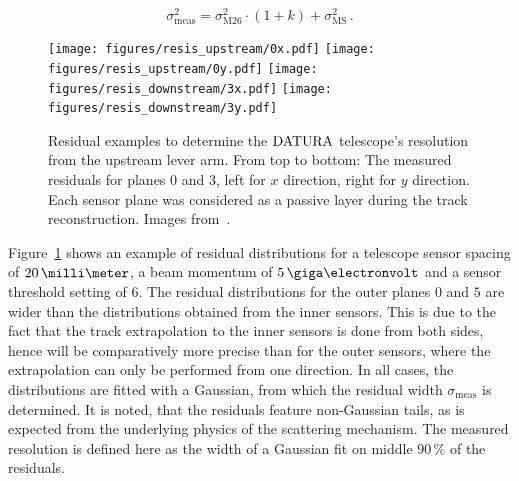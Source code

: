 \begin{equation}
\label{eq:telescoperesolutionequation_2}
\sigma_{\textrm{meas}}^2 = \sigma_{\textrm{M26}}^2 \cdot \left( 1 + k \right) +
\sigma_{\textrm{MS}}^2\,.
\end{equation}

\begin{figure}[tb]
  \centering
  \texttt{[image: figures/resis\_upstream/0x.pdf]}
  \texttt{[image: figures/resis\_upstream/0y.pdf]}
  \texttt{[image: figures/resis\_downstream/3x.pdf]}
  \texttt{[image: figures/resis\_downstream/3y.pdf]}
  \caption[Residual examples to determine the $\Datura$ telescope's resolution~\cite{ref:thomas}]{Residual examples to determine the $\Datura$ telescope's resolution from the upstream lever arm.
From top to bottom: The measured residuals for planes $0$ and $3$, left for $x$ direction, right for $y$ direction.
Each sensor plane was considered as a passive layer during the track reconstruction. Images from~\cite{ref:thomas}.}
  \label{fig:residualexample1}
\end{figure}

Figure~\ref{fig:residualexample1} shows an example of residual distributions for a telescope sensor spacing of $20\,\milli\meter$,
 a beam momentum of $5\,\giga\electronvolt$ and a sensor threshold setting of $6$.
The residual distributions for the outer planes $0$ and $5$ are wider than the distributions obtained from the inner sensors.
This is due to the fact that the track extrapolation to the inner sensors is done from both sides, hence will be comparatively more precise than for the outer sensors,
 where the extrapolation can only be performed from one direction. 
In all cases, the distributions are fitted with a Gaussian, from which the residual width $\sigma_{\textrm{meas}}$ is determined.
It is noted, that the residuals feature non-Gaussian tails, as is expected from the underlying physics of the scattering mechanism. 
The measured resolution is defined here as the width of a Gaussian fit on middle 90\,\% of the residuals. 



% 

